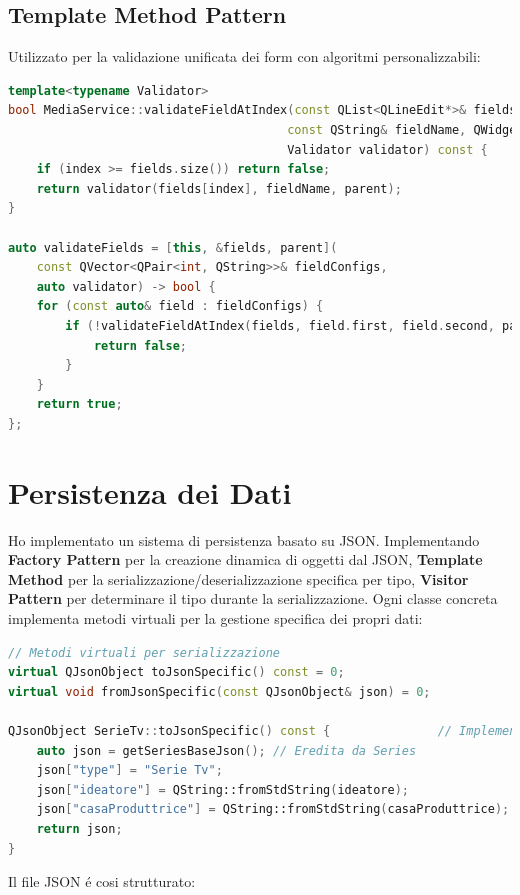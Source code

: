 \documentclass[a4paper,10pt]{article}
\begin{document}
\subsection{Template Method Pattern}
Utilizzato per la validazione unificata dei form con algoritmi personalizzabili:

\begin{lstlisting}[language=cpp, style=cppstyle]
template<typename Validator>
bool MediaService::validateFieldAtIndex(const QList<QLineEdit*>& fields, int index, 
                                       const QString& fieldName, QWidget* parent, 
                                       Validator validator) const {
    if (index >= fields.size()) return false;
    return validator(fields[index], fieldName, parent);
}

auto validateFields = [this, &fields, parent](
    const QVector<QPair<int, QString>>& fieldConfigs, 
    auto validator) -> bool {
    for (const auto& field : fieldConfigs) {
        if (!validateFieldAtIndex(fields, field.first, field.second, parent, validator)) {
            return false;
        }
    }
    return true;
};
\end{lstlisting}

\section{Persistenza dei Dati}
Ho implementato un sistema di persistenza basato su JSON. Implementando \textbf{Factory Pattern} per la creazione dinamica di oggetti dal JSON, \textbf{Template Method} per la serializzazione/deserializzazione specifica per tipo, \textbf{Visitor Pattern} per determinare il tipo durante la serializzazione. Ogni classe concreta implementa metodi virtuali per la gestione specifica dei propri dati:

\begin{lstlisting}[language=cpp, style=cppstyle]
// Metodi virtuali per serializzazione
virtual QJsonObject toJsonSpecific() const = 0;
virtual void fromJsonSpecific(const QJsonObject& json) = 0;

QJsonObject SerieTv::toJsonSpecific() const {               // Implementazione in SerieTv
    auto json = getSeriesBaseJson(); // Eredita da Series
    json["type"] = "Serie Tv";
    json["ideatore"] = QString::fromStdString(ideatore);
    json["casaProduttrice"] = QString::fromStdString(casaProduttrice);
    return json;
}
\end{lstlisting}
Il file JSON é cosi strutturato:
\end{document}

